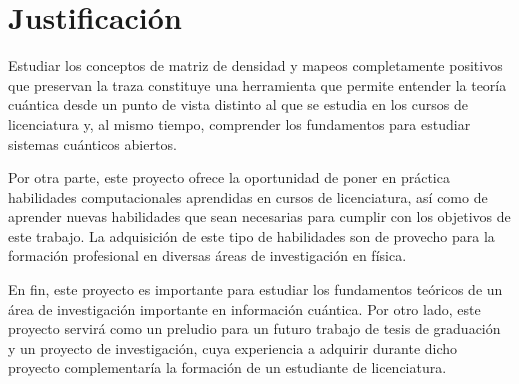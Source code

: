 \section*{Justificación}
Estudiar los conceptos de matriz de densidad y mapeos completamente
positivos que preservan la traza constituye una herramienta que permite 
entender la teoría cuántica desde un punto de vista distinto al que se estudia
en los cursos de licenciatura y, al mismo tiempo, comprender los fundamentos 
para estudiar sistemas cuánticos abiertos. 

Por otra parte, este proyecto ofrece la oportunidad de poner en práctica habilidades
computacionales aprendidas en cursos de licenciatura, así como de 
aprender nuevas habilidades que sean necesarias para cumplir con los objetivos
de este trabajo. La adquisición de este tipo de habilidades son de provecho para la formación 
profesional en diversas áreas de investigación en física. 

En fin, este proyecto es importante para estudiar los fundamentos teóricos
de un área de investigación importante en información cuántica. 
Por otro lado, este proyecto servirá como un preludio para un futuro trabajo de
tesis de graduación y un proyecto de investigación, cuya experiencia a adquirir durante
dicho proyecto complementaría la formación de un estudiante de licenciatura. 

